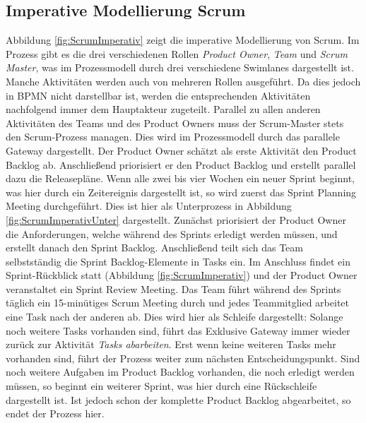 \subsection{Imperative Modellierung Scrum}

Abbildung \ref{fig:ScrumImperativ} zeigt die imperative Modellierung von Scrum. Im Prozess gibt es die drei verschiedenen Rollen \textit{Product Owner}, \textit{Team} und \textit{Scrum Master}, was im Prozessmodell durch drei verschiedene Swimlanes dargestellt ist. Manche Aktivitäten werden auch von mehreren Rollen ausgeführt. Da dies jedoch in BPMN nicht darstellbar ist, werden die entsprechenden Aktivitäten nachfolgend immer dem Hauptakteur zugeteilt.\newline
Parallel zu allen anderen Aktivitäten des Teams und des Product Owners muss der Scrum-Master stets den Scrum-Prozess managen. Dies wird im Prozessmodell durch das parallele Gateway dargestellt. \newline
Der Product Owner schätzt als erste Aktivität den Product Backlog ab. Anschließend priorisiert er den Product Backlog und erstellt parallel dazu die Releasepläne. \newline
Wenn alle zwei bis vier Wochen ein neuer Sprint beginnt, was hier durch ein Zeitereignis dargestellt ist, so wird zuerst das Sprint Planning Meeting durchgeführt. Dies ist hier als Unterprozess in Abbildung \ref{fig:ScrumImperativUnter} dargestellt. Zunächst priorisiert der Product Owner die Anforderungen, welche während des Sprints erledigt werden müssen, und erstellt danach den Sprint Backlog. Anschließend teilt sich das Team selbstständig die Sprint Backlog-Elemente in Tasks ein.\newline
Im Anschluss findet ein Sprint-Rückblick statt (Abbildung \ref{fig:ScrumImperativ}) und der Product Owner veranstaltet ein Sprint Review Meeting.\newline
Das Team führt während des Sprints täglich ein 15-minütiges Scrum Meeting durch und jedes Teammitglied arbeitet eine Task nach der anderen ab. Dies wird hier als Schleife dargestellt: Solange noch weitere Tasks vorhanden sind, führt das Exklusive Gateway immer wieder zurück zur Aktivität \textit{Tasks abarbeiten}. Erst wenn keine weiteren Tasks mehr vorhanden sind, führt der Prozess weiter zum nächsten Entscheidungspunkt.\newline
Sind noch weitere Aufgaben im Product Backlog vorhanden, die noch erledigt werden müssen, so beginnt ein weiterer Sprint, was hier durch eine Rückschleife dargestellt ist. Ist jedoch schon der komplette Product Backlog abgearbeitet, so endet der Prozess hier.


